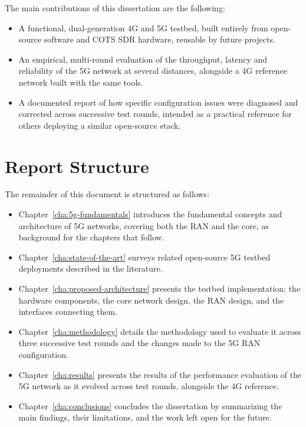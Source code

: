 The main contributions of this dissertation are the following:
\begin{itemize}
    \item A functional, dual-generation 4G and 5G testbed, built entirely from open-source software and \gls{COTS} \gls{SDR} hardware, reusable by future projects.
    \item An empirical, multi-round evaluation of the throughput, latency and reliability of the 5G network at several distances, alongside a 4G reference network built with the same tools.
    \item A documented report of how specific configuration issues were diagnosed and corrected across successive test rounds, intended as a practical reference for others deploying a similar open-source stack.
\end{itemize}

\section{Report Structure}
\label{sec:report-structure}

The remainder of this document is structured as follows:

\begin{itemize}
    \item Chapter~\ref{cha:5g-fundamentals} introduces the fundamental concepts and architecture of 5G networks, covering both the \gls{RAN} and the core, as background for the chapters that follow.
    \item Chapter~\ref{cha:state-of-the-art} surveys related open-source 5G testbed deployments described in the literature. %
    \item Chapter~\ref{cha:proposed-architecture} presents the testbed implementation: the hardware components, the core network design, the \gls{RAN} design, and the interfaces connecting them.
    \item Chapter~\ref{cha:methodology} details the methodology used to evaluate it across three successive test rounds and the changes made to the 5G \gls{RAN} configuration.
    \item Chapter~\ref{cha:results} presents the results of the performance evaluation of the 5G network as it evolved across test rounds, alongside the 4G reference.
    \item Chapter~\ref{cha:conclusions} concludes the dissertation by summarizing the main findings, their limitations, and the work left open for the future.
\end{itemize}
